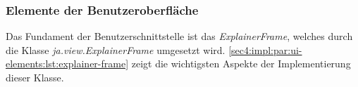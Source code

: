 \subsubsection{Elemente der Benutzeroberfläche}
\label{sec4:impl:par:ui-elements}






Das Fundament der Benutzerschnittstelle ist das \textit{ExplainerFrame}, welches durch die Klasse \textit{ja.view.ExplainerFrame} umgesetzt wird.
\cref{sec4:impl:par:ui-elements:lst:explainer-frame} zeigt die wichtigsten Aspekte der Implementierung dieser Klasse.



